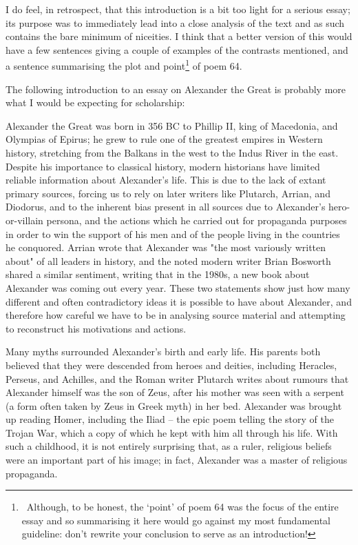 \documentclass[a4paper,10pt]{article}
\begin{document}
I do feel, in retrospect, that this introduction is a bit too light for a serious essay; its purpose was to immediately lead
into a close analysis of the text and as such contains the bare minimum of niceities. I think that a better version of this
would have a few sentences giving a couple of examples of the contrasts mentioned, and a sentence summarising the plot
and point\footnote{~Although, to be honest, the `point' of poem 64 was the focus of the entire essay and so summarising it
here would go against my most fundamental guideline: don't rewrite your conclusion to serve as an introduction!} of poem 64.

The following introduction to an essay on Alexander the Great is probably more what I would be expecting for scholarship:
\begin{mdframed}
  Alexander the Great was born in 356 BC to Phillip II, king of Macedonia, and Olympias of Epirus; he grew to rule
  one of the greatest empires in Western history, stretching from the Balkans in the west to the Indus River in the
  east. Despite his importance to classical history, modern historians have limited reliable information about Alexander's
  life. This is due to the lack of extant primary sources, forcing us to rely on later writers like Plutarch, Arrian, and
  Diodorus, and to the inherent bias present in all sources due to Alexander's hero-or-villain persona, and the actions
  which he carried out for propaganda purposes in order to win the support of his men and of the people living in the
  countries he conquored. Arrian wrote that Alexander was "the most variously written about" of all leaders in history,
  and the noted modern writer Brian Bosworth shared a similar sentiment, writing that in the 1980s, a new book about
  Alexander was coming out every year. These two statements show just how many different  and often contradictory ideas
  it is possible to have about Alexander, and therefore how careful we have to be in analysing source material and attempting
  to reconstruct his motivations and actions.

  Many myths surrounded Alexander's birth and early life. His parents both believed that they were descended from heroes
  and deities, including Heracles, Perseus, and Achilles, and the Roman writer Plutarch writes about rumours that Alexander
  himself was the son of Zeus, after his mother was seen with a serpent (a form often taken by Zeus in Greek myth) in her bed.
  Alexander was brought up reading Homer, including the Iliad – the epic poem telling the story of the Trojan War, which a
  copy of which he kept with him all through his life. With such a childhood, it is not entirely surprising that, as a ruler,
  religious beliefs were an important part of his image; in fact, Alexander was a master of religious propaganda.
\end{mdframed}
\end{document}
